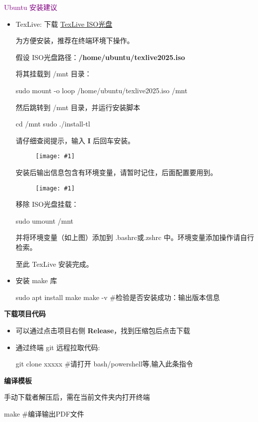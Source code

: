 \documentclass[a4paper,12pt]{ctexart}
\newenvironment{pul}[1]{
	\begin{itemize}[topsep=0pt,labelsep=.5em,leftmargin=\the\dimexpr 0.5em+ #1\relax,itemsep=0em,parsep=.5em]
	}{\end{itemize}}
\newenvironment{ul}{
	\begin{itemize}[topsep=0pt,labelsep=.5em,leftmargin=4.5em,itemsep=-.5em]
	}{\end{itemize}}
\newcommand{\pic}[1]{
	\begin{figure}[!h]
		\centering
		\texttt{[image: \#1]}
	\end{figure}
}
\begin{document}
	\qquad \textcolor{purple}{Ubuntu 安装建议}
	\begin{pul}{6em}
		\item
		TexLive: 下载 \href{https://mirrors.tuna.tsinghua.edu.cn/CTAN/systems/texlive/Images/texlive2025-20250308.iso}{TexLive ISO光盘}
		
		为方便安装，推荐在终端环境下操作。
		
		假设 ISO光盘路径：\textbf{/home/ubuntu/texlive2025.iso}
		
		将其挂载到 /mnt 目录：
		
		\begin{bashcode}
    sudo mount -o loop /home/ubuntu/texlive2025.iso /mnt
		\end{bashcode}
		
		然后跳转到 /mnt 目录，并运行安装脚本
		\begin{bashcode}
	cd /mnt
	sudo ./install-tl
		\end{bashcode}
		请仔细查阅提示，输入 \textbf{I} 后回车安装。
		\pic{texlive-install-hint.png}
		
		安装后输出信息包含有环境变量，请暂时记住，后面配置要用到。
		\pic{texlive-envs.png}
		
		移除 ISO光盘挂载：
		\begin{bashcode}
	sudo umount /mnt
		\end{bashcode}
		
		并将环境变量（如上图）添加到 .bashrc或.zshrc 中。环境变量添加操作请自行检索。
		
		至此 TexLive 安装完成。
		
		
		\item
		安装 make 库
		\begin{bashcode}
	sudo apt install make
	make -v #检验是否安装成功：输出版本信息
		\end{bashcode} 
	
	\end{pul}
	 
	\textbf{下载项目代码}
	\begin{ul}
		\item 可以通过点击项目右侧 \textbf{Release}，找到压缩包后点击下载
		\item
		通过终端 git 远程拉取代码:
		\begin{bashcode}[xleftmargin=2em]
  git clone xxxxx	#请打开 bash/powershell等,输入此条指令
		\end{bashcode}
	\end{ul}
	
	\textbf{编译模板}

	\qquad 手动下载者解压后，需在当前文件夹内打开终端
	\begin{bashcode}[xleftmargin=4em]
  make #编译输出PDF文件
	\end{bashcode}
	
\end{document}
